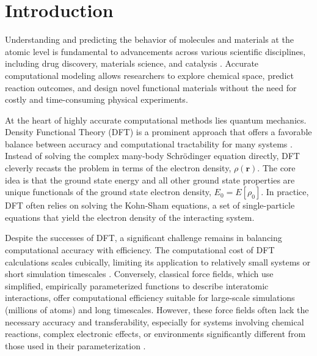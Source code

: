 \section{Introduction}

Understanding and predicting the behavior of molecules and materials at the atomic level is fundamental to advancements across various scientific disciplines, including drug discovery, materials science, and catalysis \cite{wang2018silico, dominy2004native, cicaloni2019applications}. Accurate computational modeling allows researchers to explore chemical space, predict reaction outcomes, and design novel functional materials without the need for costly and time-consuming physical experiments.

At the heart of highly accurate computational methods lies quantum mechanics. Density Functional Theory (DFT) is a prominent approach that offers a favorable balance between accuracy and computational tractability for many systems \cite{engel2011density}. Instead of solving the complex many-body Schrödinger equation directly, DFT cleverly recasts the problem in terms of the electron density, $\rho(\mathbf{r})$. The core idea is that the ground state energy and all other ground state properties are unique functionals of the ground state electron density, $E_0 = E[\rho_0]$. In practice, DFT often relies on solving the Kohn-Sham equations, a set of single-particle equations that yield the electron density of the interacting system.

Despite the successes of DFT, a significant challenge remains in balancing computational accuracy with efficiency. The computational cost of DFT calculations scales cubically, limiting its application to relatively small systems or short simulation timescales \cite{engel2011density, cohen2012challenges}. Conversely, classical force fields, which use simplified, empirically parameterized functions to describe interatomic interactions, offer computational efficiency suitable for large-scale simulations (millions of atoms) and long timescales. However, these force fields often lack the necessary accuracy and transferability, especially for systems involving chemical reactions, complex electronic effects, or environments significantly different from those used in their parameterization \cite{herbers2013grand}.

